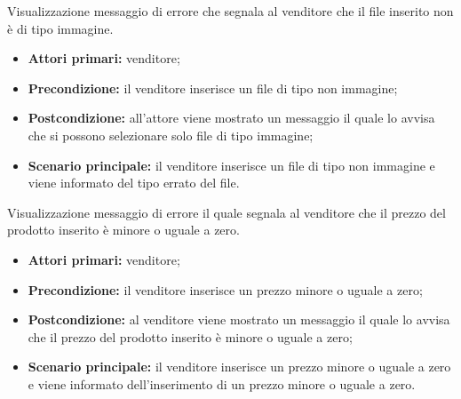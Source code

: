 \begin{comment}
\UC{Visualizzazione messaggio di errore prodotto non disponibile}
L'acquirente o l'utente non autenticato richiede un prodotto che non è disponibile.
\begin{itemize}
    \item \textbf{Attori primari:} acquirente o utente non autenticato;
    \item \textbf{Precondizione:} l'attore richiede di aggiungere al carrello un prodotto non disponibile;
    \item \textbf{Postcondizione:} viene impedita l'aggiunta al carrello e segnalata la causa.
    \item \textbf{Scenario principale:}
        \begin{itemize}
            \item L'utente richiede di aggiungere al carrello un prodotto non disponibile;
            \item Viene scartata la modifica, il carrello rimane invariato;
            \item Viene visualizzato un visualizzato un errore che indica la non disponibilità del prodotto.
        \end{itemize}
\end{itemize}
\end{comment}

Visualizzazione messaggio di errore che segnala al venditore che il file inserito non è di tipo immagine.
\begin{itemize}
    \item \textbf{Attori primari:} venditore;
    \item \textbf{Precondizione:} il venditore inserisce un file di tipo non immagine;
    \item \textbf{Postcondizione:} all'attore viene mostrato un messaggio il quale lo avvisa che si possono selezionare solo file di tipo immagine;
    \item \textbf{Scenario principale:} il venditore inserisce un file di tipo non immagine e viene informato del tipo errato del file.
\end{itemize}

Visualizzazione messaggio di errore il quale segnala al venditore che il prezzo del prodotto inserito è minore o uguale a zero.
\begin{itemize}
    \item \textbf{Attori primari:} venditore;
    \item \textbf{Precondizione:} il venditore inserisce un prezzo minore o uguale a zero;
    \item \textbf{Postcondizione:} al venditore viene mostrato un messaggio il quale lo avvisa che il prezzo del prodotto inserito è minore o uguale a zero;
    \item \textbf{Scenario principale:} il venditore inserisce un prezzo minore o uguale a zero e viene informato dell'inserimento di un prezzo minore o uguale a zero.
\end{itemize}

